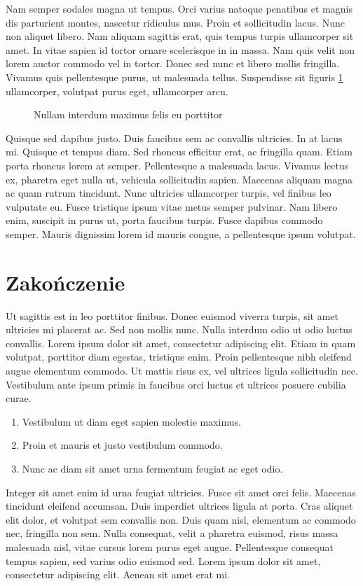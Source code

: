 \documentclass[polish,engineering]{wizthesis}
\begin{document}
Nam semper sodales magna ut tempus. Orci varius natoque penatibus et magnis dis parturient montes, nascetur ridiculus mus. Proin et sollicitudin lacus. Nunc non aliquet libero. Nam aliquam sagittis erat, quis tempus turpis ullamcorper sit amet. In vitae sapien id tortor ornare scelerisque in in massa. Nam quis velit non lorem auctor commodo vel in tortor. Donec sed nunc et libero mollis fringilla. Vivamus quis pellentesque purus, ut malesuada tellus. Suspendisse sit figuris \ref{fig:wykres} ullamcorper, volutpat purus eget, ullamcorper arcu.
\begin{figure}[ht]
  \centering
  
  \caption{Nullam interdum maximus felis eu porttitor}
  \label{fig:wykres}
\end{figure}
Quisque sed dapibus justo. Duis faucibus sem ac convallis ultricies. In at lacus mi. Quisque et tempus diam. Sed rhoncus efficitur erat, ac fringilla quam. Etiam porta rhoncus lorem at semper. Pellentesque a malesuada lacus. Vivamus lectus ex, pharetra eget nulla ut, vehicula sollicitudin sapien. Maecenas aliquam magna ac quam rutrum tincidunt. Nunc ultricies ullamcorper turpis, vel finibus leo vulputate eu. Fusce tristique ipsum vitae metus semper pulvinar. Nam libero enim, suscipit in purus ut, porta faucibus turpis. Fusce dapibus commodo semper. Mauris dignissim lorem id mauris congue, a pellentesque ipsum volutpat.

\backmatter %

\chapter{Zakończenie}

Ut sagittis est in leo porttitor finibus. Donec euismod viverra turpis, sit amet ultricies mi placerat ac. Sed non mollis nunc. Nulla interdum odio ut odio luctus convallis. Lorem ipsum dolor sit amet, consectetur adipiscing elit. Etiam in quam volutpat, porttitor diam egestas, tristique enim. Proin pellentesque nibh eleifend augue elementum commodo. Ut mattis risus ex, vel ultrices ligula sollicitudin nec. Vestibulum ante ipsum primis in faucibus orci luctus et ultrices posuere cubilia curae.
\begin{enumerate}[noitemsep]
  \item Vestibulum ut diam eget sapien molestie maximus.
  \item Proin et mauris et justo vestibulum commodo.
  \item Nunc ac diam sit amet urna fermentum feugiat ac eget odio.
\end{enumerate}
Integer sit amet enim id urna feugiat ultricies. Fusce sit amet orci felis. Maecenas tincidunt eleifend accumsan. Duis imperdiet ultrices ligula at porta. Cras aliquet elit dolor, et volutpat sem convallis non. Duis quam nisl, elementum ac commodo nec, fringilla non sem. Nulla consequat, velit a pharetra euismod, risus massa malesuada nisl, vitae cursus lorem purus eget augue. Pellentesque consequat tempus sapien, sed varius odio euismod sed. Lorem ipsum dolor sit amet, consectetur adipiscing elit. Aenean sit amet erat mi.
\end{document}
